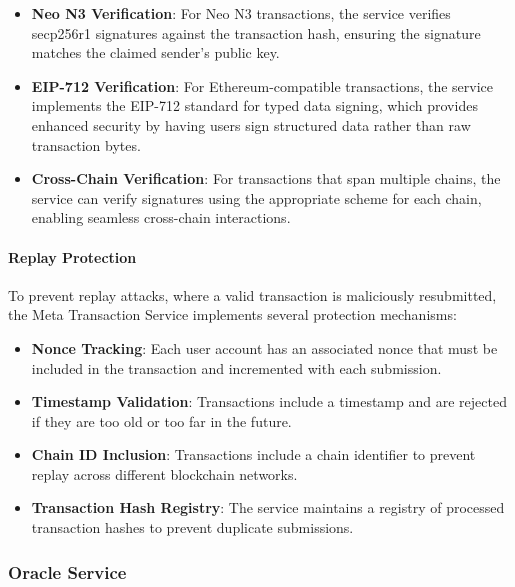 \begin{itemize}
    \item \textbf{Neo N3 Verification}: For Neo N3 transactions, the service verifies secp256r1 signatures against the transaction hash, ensuring the signature matches the claimed sender's public key.
    
    \item \textbf{EIP-712 Verification}: For Ethereum-compatible transactions, the service implements the EIP-712 standard for typed data signing, which provides enhanced security by having users sign structured data rather than raw transaction bytes.
    
    \item \textbf{Cross-Chain Verification}: For transactions that span multiple chains, the service can verify signatures using the appropriate scheme for each chain, enabling seamless cross-chain interactions.
\end{itemize}

\paragraph{Replay Protection}
To prevent replay attacks, where a valid transaction is maliciously resubmitted, the Meta Transaction Service implements several protection mechanisms:

\begin{itemize}
    \item \textbf{Nonce Tracking}: Each user account has an associated nonce that must be included in the transaction and incremented with each submission.
    
    \item \textbf{Timestamp Validation}: Transactions include a timestamp and are rejected if they are too old or too far in the future.
    
    \item \textbf{Chain ID Inclusion}: Transactions include a chain identifier to prevent replay across different blockchain networks.
    
    \item \textbf{Transaction Hash Registry}: The service maintains a registry of processed transaction hashes to prevent duplicate submissions.
\end{itemize}

\subsubsection{Oracle Service}
\label{subsubsec:oracle}

